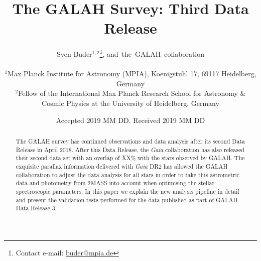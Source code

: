 \documentclass[fleqn,usenatbib,useAMS]{mnras}
\begin{document}
\begin{CJK*}{UTF8}{gbsn}
\label{firstpage}
\pagerange{\pageref{firstpage}--\pageref{lastpage}}


\title{The GALAH Survey: Third Data Release}

\author[Buder et al.]{Sven Buder$^{1,2}$\thanks{Contact e-mail: \href{mailto:buder@mpia.de}{buder@mpia.de}},
and~the~GALAH~collaboration
\\
\\
$^{1}$Max Planck Institute  for Astronomy (MPIA), Koenigstuhl 17, 69117 Heidelberg, Germany\\
$^{2}$Fellow of the International Max Planck Research School for Astronomy \& Cosmic Physics at the University of Heidelberg, Germany
}

\date{Accepted 2019 MM DD. Received 2019 MM DD}


\maketitle
\end{CJK*}

\begin{abstract}
The GALAH survey has continued observations and data analysis after its second Data Release in April 2018. After this Data Release, the \textit{Gaia} collaboration has also released their second data set with an overlap of XX\% with the stars observed by GALAH. The exquisite parallax information delivered with \textit{Gaia} DR2 has allowed the GALAH collaboration to adjust the data analysis for all stars in order to take this astrometric data and photometry from 2MASS into account when optimising the stellar spectroscopic parameters.
In this paper we explain the new analysis pipeline in detail and present the validation tests performed for the data published as part of GALAH Data Release 3.
\end{abstract}
\end{document}
